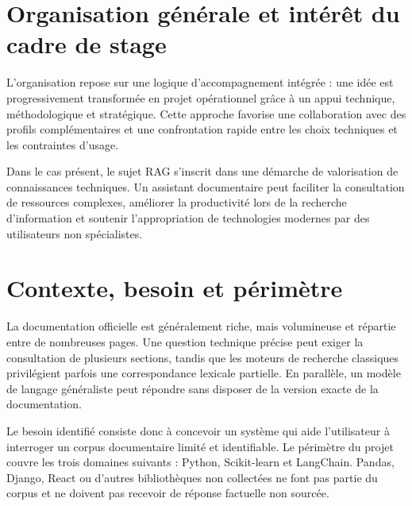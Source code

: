 \documentclass[12pt,a4paper,oneside]{report}
\begin{document}
\section{Organisation générale et intérêt du cadre de stage}

L'organisation repose sur une logique d'accompagnement intégrée : une idée est
progressivement transformée en projet opérationnel grâce à un appui technique,
méthodologique et stratégique. Cette approche favorise une collaboration avec
des profils complémentaires et une confrontation rapide entre les choix
techniques et les contraintes d'usage.

Dans le cas présent, le sujet RAG s'inscrit dans une démarche de valorisation
de connaissances techniques. Un assistant documentaire peut faciliter la
consultation de ressources complexes, améliorer la productivité lors de la
recherche d'information et soutenir l'appropriation de technologies modernes
par des utilisateurs non spécialistes.

\section{Contexte, besoin et périmètre}

La documentation officielle est généralement riche, mais volumineuse et
répartie entre de nombreuses pages. Une question technique précise peut exiger
la consultation de plusieurs sections, tandis que les moteurs de recherche
classiques privilégient parfois une correspondance lexicale partielle. En
parallèle, un modèle de langage généraliste peut répondre sans disposer de la
version exacte de la documentation.

Le besoin identifié consiste donc à concevoir un système qui aide l'utilisateur
à interroger un corpus documentaire limité et identifiable. Le périmètre du
projet couvre les trois domaines suivants : Python, Scikit-learn et LangChain.
Pandas, Django, React ou d'autres bibliothèques non collectées ne font pas partie
du corpus et ne doivent pas recevoir de réponse factuelle non sourcée.
\end{document}
